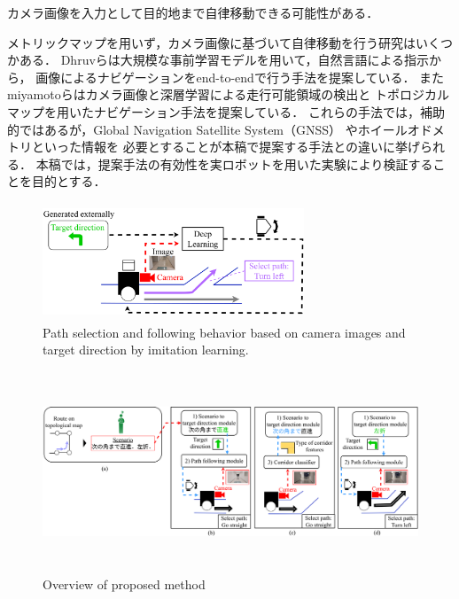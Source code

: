 \documentclass{sice-si}
\begin{document}
カメラ画像を入力として目的地まで自律移動できる可能性がある．
\par
メトリックマップを用いず，カメラ画像に基づいて自律移動を行う研究はいくつかある．
Dhruvら\cite{shah2022lmnav}は大規模な事前学習モデルを用いて，自然言語による指示から，
画像によるナビゲーションをend-to-endで行う手法を提案している．
またmiyamotoら\cite{seg_meizi}はカメラ画像と深層学習による走行可能領域の検出と
トポロジカルマップを用いたナビゲーション手法を提案している．
これらの手法では，補助的ではあるが，Global Navigation Satellite System（GNSS）
やホイールオドメトリといった情報を
必要とすることが本稿で提案する手法との違いに挙げられる．
本稿では，提案手法の有効性を実ロボットを用いた実験により検証することを目的とする．
\par
\begin{figure}[h!]
    \centering
     \includegraphics[height=35mm,width=78mm]{./figs/lergan.pdf}
     \caption{Path selection and following behavior based on camera images and
     target direction by imitation learning.}\label{fig:camera_base}
\end{figure}
\begin{figure}[t]
    \centering
     \includegraphics[height=60mm,width=160mm]{./figs/absv3.png}
     \caption{Overview of proposed method}\label{fig:system}
\end{figure}
\end{document}
